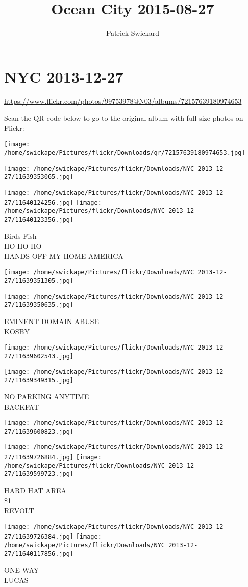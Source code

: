 \documentclass[10pt,letterpaper]{article}
\title{Ocean City 2015-08-27}
\author{Patrick Swickard}
\date{}
\begin{document}
\section*{NYC 2013-12-27}

\url{https://www.flickr.com/photos/99753978@N03/albums/72157639180974653}

Scan the QR code below to go to the original album with full-size photos on Flickr:

\texttt{[image: /home/swickape/Pictures/flickr/Downloads/qr/72157639180974653.jpg]}
\pagebreak

\texttt{[image: /home/swickape/Pictures/flickr/Downloads/NYC 2013-12-27/11639353065.jpg]}

\vspace{0.25in}
\texttt{[image: /home/swickape/Pictures/flickr/Downloads/NYC 2013-12-27/11640124256.jpg]}
\texttt{[image: /home/swickape/Pictures/flickr/Downloads/NYC 2013-12-27/11640123356.jpg]}

Birds Fish\\
HO HO HO\\
HANDS OFF MY HOME AMERICA
\pagebreak

\texttt{[image: /home/swickape/Pictures/flickr/Downloads/NYC 2013-12-27/11639351305.jpg]}

\vspace{0.25in}
\texttt{[image: /home/swickape/Pictures/flickr/Downloads/NYC 2013-12-27/11639350635.jpg]}

EMINENT DOMAIN ABUSE\\
KOSBY
\pagebreak

\texttt{[image: /home/swickape/Pictures/flickr/Downloads/NYC 2013-12-27/11639602543.jpg]}

\vspace{0.25in}
\texttt{[image: /home/swickape/Pictures/flickr/Downloads/NYC 2013-12-27/11639349315.jpg]}

NO PARKING ANYTIME\\
BACKFAT
\pagebreak

\texttt{[image: /home/swickape/Pictures/flickr/Downloads/NYC 2013-12-27/11639600823.jpg]}

\vspace{0.25in}
\texttt{[image: /home/swickape/Pictures/flickr/Downloads/NYC 2013-12-27/11639726884.jpg]}
\texttt{[image: /home/swickape/Pictures/flickr/Downloads/NYC 2013-12-27/11639599723.jpg]}

HARD HAT AREA\\
\$1\\
REVOLT
\pagebreak

\texttt{[image: /home/swickape/Pictures/flickr/Downloads/NYC 2013-12-27/11639726384.jpg]}
\texttt{[image: /home/swickape/Pictures/flickr/Downloads/NYC 2013-12-27/11640117856.jpg]}

ONE WAY\\
LUCAS
\pagebreak
\end{document}
